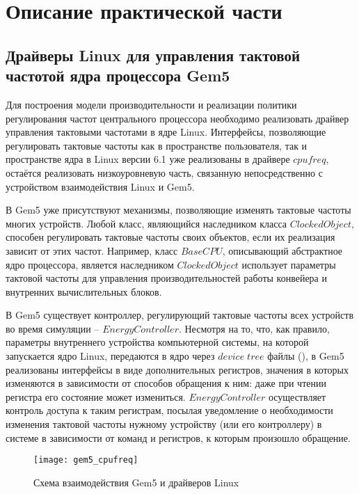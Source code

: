 \section{Описание практической части}
\label{sec:Section4} 

\subsection{Драйверы Linux для управления тактовой частотой ядра процессора Gem5}

    Для построения модели производительности и реализации политики регулирования частот центрального процессора
    необходимо реализовать драйвер управления тактовыми частотами в ядре Linux. Интерфейсы, позволяющие регулировать
    тактовые частоты как в пространстве пользователя, так и пространстве ядра в Linux версии 6.1 уже
    реализованы в драйвере $cpufreq$, остаётся реализовать низкоуровневую часть, связанную непосредственно
    с устройством взаимодействия Linux и Gem5.

    В Gem5 уже присутствуют механизмы, позволяющие изменять тактовые частоты многих устройств. Любой
    класс, являющийся наследником класса $ClockedObject$, способен регулировать тактовые частоты своих
    объектов, если их реализация зависит от этих частот. Например, класс $BaseCPU$, описывающий
    абстрактное ядро процессора, является наследником $ClockedObject$ использует параметры
    тактовой частоты для управления производительностей работы конвейера и внутренних вычислительных блоков.

    В Gem5 существует контроллер, регулирующий тактовые частоты всех устройств во время симуляции --
    $EnergyController$. Несмотря на то, что, как правило, параметры внутреннего устройства компьютерной
    системы, на которой запускается ядро Linux, передаются в ядро через $device \; tree$ файлы (\cite{KernelDocsDTS}),
    в Gem5 реализованы интерфейсы в виде дополнительных регистров, значения в которых изменяются
    в зависимости от способов обращения к ним: даже при чтении регистра его состояние может измениться.
    $EnergyController$ осуществляет контроль доступа к таким регистрам, посылая уведомление о
    необходимости изменения тактовой частоты нужному устройству (или его контроллеру) в системе
    в зависимости от команд и регистров, к которым произошло обращение.

    \begin{figure}[!h]
        \caption{Схема взаимодействия Gem5 и драйверов Linux}
        \centering
        \texttt{[image: gem5\_cpufreq]}
        \label{gem5_cpufreq}
    \end{figure}

